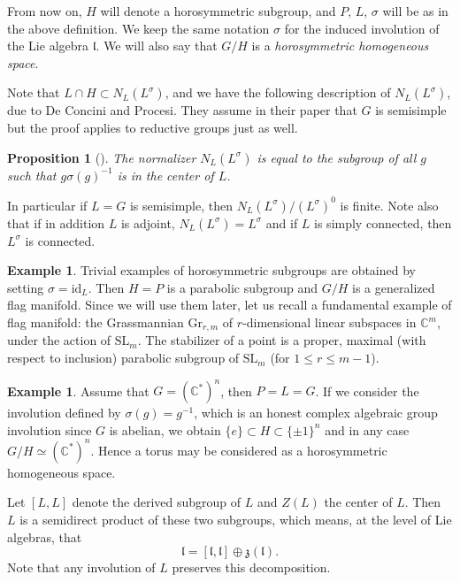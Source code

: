\documentclass{amsart}
\newtheorem{prop}[thm]{Proposition}
\theoremstyle{definition}
\newtheorem{exa}[thm]{Example}
\begin{document}
From now on, $H$ will denote a horosymmetric subgroup, and $P$, $L$, 
$\sigma$ will be as in the above definition. We keep the same notation 
$\sigma$ for the induced involution of the Lie algebra $\mathfrak{l}$.
We will also say that $G/H$ is a \emph{horosymmetric homogeneous space}.

Note that $L\cap H\subset N_L(L^{\sigma})$, and we have the following 
description of $N_L(L^{\sigma})$, due to De Concini and Procesi. 
They assume in their paper that $G$ is  semisimple but the proof 
applies to reductive groups just as well.

\begin{prop}[\cite{DCP83}]
\label{prop_normalizer}
The normalizer $N_L(L^{\sigma})$ is equal to the subgroup of all $g$ 
such that $g\sigma(g)^{-1}$ is in the center of $L$. 
\end{prop}

In particular if $L=G$ is semisimple, then $N_L(L^{\sigma})/(L^{\sigma})^0$
is finite. Note also that if in addition $L$ is adjoint, $N_L(L^{\sigma})=L^{\sigma}$ 
and if $L$ is simply connected, then $L^{\sigma}$ is connected. 

\begin{exa}
\label{exa_GFM}
Trivial examples of horosymmetric subgroups are obtained by 
setting $\sigma = \mathrm{id}_L$. Then $H=P$ is a parabolic subgroup 
and $G/H$ is a generalized flag manifold.
Since we will use them later, let us recall a fundamental example 
of flag manifold: the Grassmannian $\mathrm{Gr}_{r,m}$ of $r$-dimensional 
linear subspaces in $\mathbb{C}^m$, under the action of $\mathrm{SL}_m$.
The stabilizer of a point is a proper, maximal (with respect to inclusion) 
parabolic subgroup of $\mathrm{SL}_m$ (for $1\leq r\leq m-1$).
\end{exa}

\begin{exa}
\label{exa_toric}
Assume that $G=(\mathbb{C}^*)^n$, then $P=L=G$. If we consider the 
involution defined by $\sigma(g)=g^{-1}$, which is an honest complex 
algebraic group involution since $G$ is abelian, we obtain 
$\{e\}\subset H \subset \{\pm 1\}^n$ and in any case 
$G/H \simeq (\mathbb{C}^*)^n$. Hence a torus 
may be considered as a horosymmetric homogeneous space. 
\end{exa}

Let $[L,L]$ denote the derived subgroup of $L$ and $Z(L)$ the center 
of $L$. Then $L$ is a semidirect product of these two subgroups, which 
means, at the level of Lie algebras, that 
\[ 
\mathfrak{l} = 
[\mathfrak{l},\mathfrak{l}] \oplus \mathfrak{z}(\mathfrak{l}).
\]
Note that any involution of $L$ preserves this decomposition.
\end{document}
